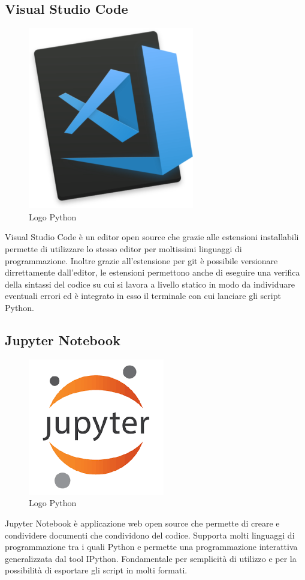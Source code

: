 \subsection{Visual Studio Code}
\begin{figure}[H]
	\begin{center} \includegraphics[scale=0.2]{figures/Visual_Studio_code}
		\caption[Bin packing figures]{Logo Python}
	\end{center}
\end{figure}
Visual Studio Code è un editor open source che grazie alle estensioni installabili permette di utilizzare lo stesso editor per moltissimi linguaggi di programmazione. Inoltre grazie all'estensione per git è possibile versionare dirrettamente dall'editor, le estensioni permettono anche di eseguire una verifica della sintassi del codice su cui si lavora a livello statico in modo da individuare eventuali errori ed è integrato in esso il terminale con cui lanciare gli script Python.

\subsection{Jupyter Notebook}
\begin{figure}[H]
	\begin{center} \includegraphics[scale=0.2]{figures/jupyter}
		\caption[Bin packing figures]{Logo Python}
	\end{center}
\end{figure}
Jupyter Notebook è applicazione web open source che permette di creare e condividere documenti che condividono del codice. Supporta molti linguaggi di programmazione tra i quali Python e permette una programmazione interattiva generalizzata dal tool IPython. Fondamentale per semplicità di utilizzo e per la possibilità di esportare gli script in molti formati.

